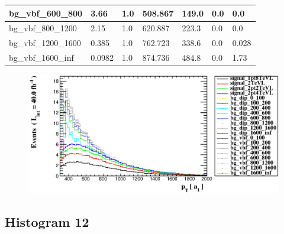 \documentclass[a4paper, 10pt]{article}
\begin{document}
\begin{table}[H]
\begin{center}
\begin{tabular}{|m{23.0mm}|m{23.0mm}|m{18.0mm}|m{19.0mm}|m{19.0mm}|m{19.0mm}|m{19.0mm}|}
      \hline
      {\cellcolor{white}         bg\_vbf\_600\_800}& {\cellcolor{white}         3.66}& {\cellcolor{white}         1.0}& {\cellcolor{white}         508.867}& {\cellcolor{white}         149.0}& {\cellcolor{green}         0.0}& {\cellcolor{green}         0.0}\\
      \hline
      {\cellcolor{white}         bg\_vbf\_800\_1200}& {\cellcolor{white}         2.15}& {\cellcolor{white}         1.0}& {\cellcolor{white}         620.887}& {\cellcolor{white}         223.3}& {\cellcolor{green}         0.0}& {\cellcolor{green}         0.0}\\
      \hline
      {\cellcolor{white}         bg\_vbf\_1200\_1600}& {\cellcolor{white}         0.385}& {\cellcolor{white}         1.0}& {\cellcolor{white}         762.723}& {\cellcolor{white}         338.6}& {\cellcolor{green}         0.0}& {\cellcolor{green}         0.028}\\
      \hline
      {\cellcolor{white}         bg\_vbf\_1600\_inf}& {\cellcolor{white}         0.0982}& {\cellcolor{white}         1.0}& {\cellcolor{white}         874.736}& {\cellcolor{white}         484.8}& {\cellcolor{green}         0.0}& {\cellcolor{green}         1.73}\\
\hline
    \end{tabular}
  \end{center}
\end{table}

\begin{figure}[H]
  \begin{center}
    \includegraphics[scale=0.45]{selection_10.eps}\\
\caption{   }
  \end{center}
\end{figure}
      \newpage
\subsection{ Histogram 12}
\end{document}
